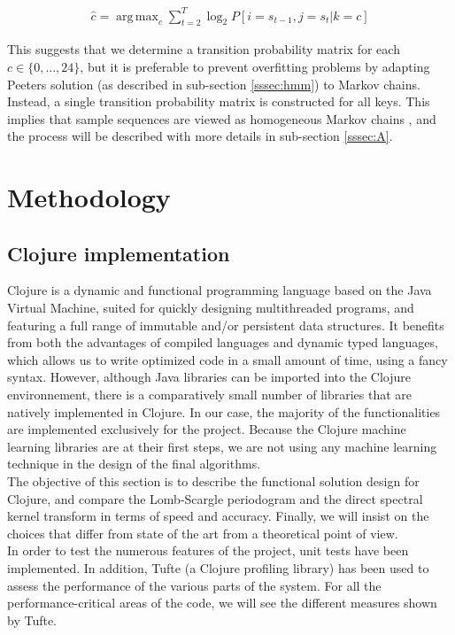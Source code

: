\documentclass[letterpaper]{article}
\DeclareMathOperator*{\argmax}{arg\,max}
\begin{document}
\begin{align}
\hat{c} = \argmax_c \sum_{t=2}^{T} \log_2 P[i=s_{t-1}, j=s_{t} | k = c]
\label{logproba}
\end{align}

This suggests that we determine a transition probability matrix for each $c \in \{0, ..., 24\}$, but it is preferable to prevent overfitting problems by adapting Peeter\textquotesingle s solution (as described in sub-section \ref{sssec:hmm}) to Markov chains. Instead, a single transition probability matrix is constructed for all keys. This implies that sample sequences are viewed as homogeneous Markov chains \citep{AUTOMATA}, and the process will be described with more details in sub-section \ref{sssec:A}.

\section{Methodology}


\subsection{Clojure implementation}

Clojure is a dynamic and functional programming language based on the Java Virtual Machine, suited for quickly designing multithreaded programs,
and featuring a full range of immutable and/or persistent data structures. It benefits from both the advantages of compiled languages and dynamic typed
languages, which allows us to write optimized code in a small amount of time, using a fancy syntax. However, although Java libraries can be imported into the Clojure environnement, there is a comparatively small number of libraries that are natively implemented in Clojure. In our case, the majority of the functionalities
are implemented exclusively for the project. Because the Clojure machine learning libraries are at their first steps, we are not using any machine learning 
technique in the design of the final algorithms.\\

The objective of this section is to describe the functional solution design for Clojure, and compare the Lomb-Scargle periodogram and the direct spectral kernel
transform in terms of speed and accuracy. Finally, we will insist on the choices that differ from state of the art from a theoretical point of view.\\

In order to test the numerous features of the project, unit tests have been implemented. In addition, Tufte (a Clojure profiling library) has been used to assess the performance of the various parts of the system. For all the performance-critical areas of the code, we will see the different measures shown by Tufte.\\
\end{document}
